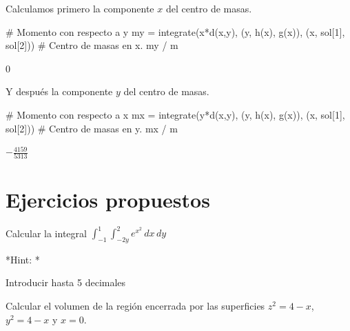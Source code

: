 \documentclass[
  a4paper,
]{scrreport}
\newenvironment{Shaded}{\begin{snugshade}}{\end{snugshade}}
\newcommand{\CommentTok}[1]{\textcolor[rgb]{0.37,0.37,0.37}{#1}}
\newcommand{\FloatTok}[1]{\textcolor[rgb]{0.68,0.00,0.00}{#1}}
\newcommand{\FunctionTok}[1]{\textcolor[rgb]{0.28,0.35,0.67}{#1}}
\newcommand{\NormalTok}[1]{\textcolor[rgb]{0.00,0.23,0.31}{#1}}
\newcommand{\OperatorTok}[1]{\textcolor[rgb]{0.37,0.37,0.37}{#1}}
\theoremstyle{definition}
\theoremstyle{remark}
\begin{document}
\begin{enumerate}
\begin{tcolorbox}
  Calculamos primero la componente \(x\) del centro de masas.

\begin{Shaded}
\begin{Highlighting}[]
\CommentTok{\# Momento con respecto a y}
\NormalTok{my }\OperatorTok{=} \FunctionTok{integrate}\NormalTok{(}\FunctionTok{x*d}\NormalTok{(x,y), (y, }\FunctionTok{h}\NormalTok{(x), }\FunctionTok{g}\NormalTok{(x)), (x, sol[}\FloatTok{1}\NormalTok{], sol[}\FloatTok{2}\NormalTok{]))}
\CommentTok{\# Centro de masas en x.}
\NormalTok{my }\OperatorTok{/}\NormalTok{ m}
\end{Highlighting}
\end{Shaded}

  $0$

  Y después la componente \(y\) del centro de masas.

\begin{Shaded}
\begin{Highlighting}[]
\CommentTok{\# Momento con respecto a x}
\NormalTok{mx }\OperatorTok{=} \FunctionTok{integrate}\NormalTok{(}\FunctionTok{y*d}\NormalTok{(x,y), (y, }\FunctionTok{h}\NormalTok{(x), }\FunctionTok{g}\NormalTok{(x)), (x, sol[}\FloatTok{1}\NormalTok{], sol[}\FloatTok{2}\NormalTok{]))}
\CommentTok{\# Centro de masas en y.}
\NormalTok{mx }\OperatorTok{/}\NormalTok{ m}
\end{Highlighting}
\end{Shaded}

  $- \frac{4159}{5313}$

  \end{tcolorbox}
\end{enumerate}

\hypertarget{ejercicios-propuestos-8}{%
\section{Ejercicios propuestos}\label{ejercicios-propuestos-8}}

\leavevmode{}%
Calcular la integral \(\int_{-1}^1\int_{-2y}^{2} e^{x^2}\,dx\,dy\)

\vspace{18pt}*Hint: *

Introducir hasta 5 decimales

\leavevmode{}%
Calcular el volumen de la región encerrada por las superficies
\(z^2=4-x\), \(y^2=4-x\) y \(x=0\).
\end{document}
